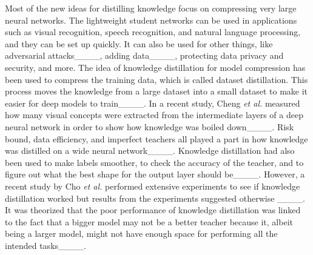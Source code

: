 Most of the new ideas for distilling knowledge focus on compressing very large neural networks. The lightweight student networks can be used in applications such as visual recognition, speech recognition, and natural language processing, and they can be set up quickly. It can also be used for other things, like adversarial attacks____, adding data____, protecting data privacy and security, and more. The idea of knowledge distillation for model compression has been used to compress the training data, which is called dataset distillation. This process moves the knowledge from a large dataset into a small dataset to make it easier for deep models to train____.
In a recent study, Cheng \textit{et al.} measured how many visual concepts were extracted from the intermediate layers of a deep neural network in order to show how knowledge was boiled down____. Risk bound, data efficiency, and imperfect teachers all played a part in how knowledge was distilled on a wide neural network____. Knowledge distillation had also been used to make labels smoother, to check the accuracy of the teacher, and to figure out what the best shape for the output layer should be____. However, a recent study by Cho \textit{et al.} performed extensive experiments to see if knowledge distillation worked but results from the experiments suggested otherwise ____. It was theorized that the poor performance of knowledge distillation was linked to the fact that a bigger model may not be a better teacher because it, albeit being a larger model, might not have enough space for performing all the intended tasks____. 


